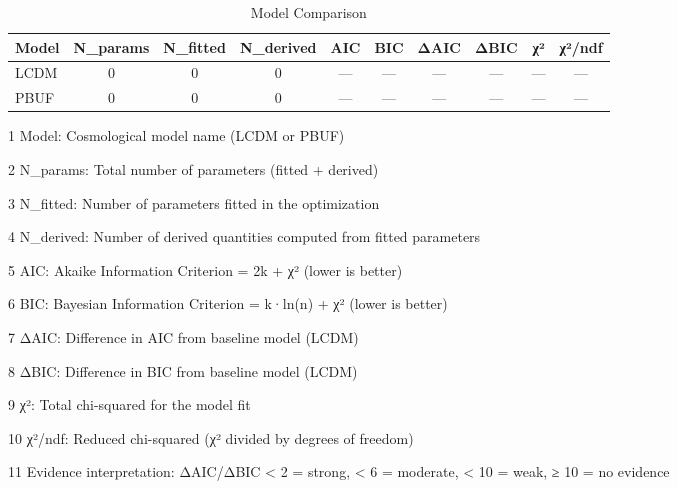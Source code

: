 \begin{table}[htbp]
\centering
\caption{Model Comparison}
\label{tab:model_comparison}
\begin{tabular}{lccccccccc}
\hline
Model & N_params & N_fitted & N_derived & AIC & BIC & ΔAIC & ΔBIC & χ² & χ²/ndf \\
\hline
LCDM & 0 & 0 & 0 & — & — & — & — & — & — \\
PBUF & 0 & 0 & 0 & — & — & — & — & — & — \\
\hline
\end{tabular}
\begin{tablenotes}
\small
\item[1] Model: Cosmological model name (LCDM or PBUF)
\item[2] N_params: Total number of parameters (fitted + derived)
\item[3] N_fitted: Number of parameters fitted in the optimization
\item[4] N_derived: Number of derived quantities computed from fitted parameters
\item[5] AIC: Akaike Information Criterion = 2k + χ² (lower is better)
\item[6] BIC: Bayesian Information Criterion = k·ln(n) + χ² (lower is better)
\item[7] ΔAIC: Difference in AIC from baseline model (LCDM)
\item[8] ΔBIC: Difference in BIC from baseline model (LCDM)
\item[9] χ²: Total chi-squared for the model fit
\item[10] χ²/ndf: Reduced chi-squared (χ² divided by degrees of freedom)
\item[11] Evidence interpretation: ΔAIC/ΔBIC < 2 = strong, < 6 = moderate, < 10 = weak, ≥ 10 = no evidence
\end{tablenotes}
\end{table}